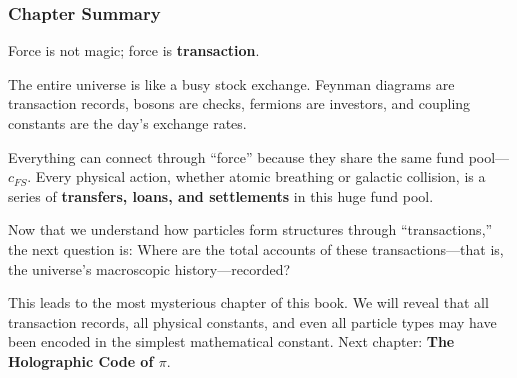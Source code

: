 \subsubsection{Chapter Summary}

Force is not magic; force is \textbf{transaction}.

The entire universe is like a busy stock exchange. Feynman diagrams are transaction records, bosons are checks, fermions are investors, and coupling constants are the day's exchange rates.

Everything can connect through ``force'' because they share the same fund pool---$c_{FS}$. Every physical action, whether atomic breathing or galactic collision, is a series of \textbf{transfers, loans, and settlements} in this huge fund pool.

Now that we understand how particles form structures through ``transactions,'' the next question is: Where are the total accounts of these transactions---that is, the universe's macroscopic history---recorded?

This leads to the most mysterious chapter of this book. We will reveal that all transaction records, all physical constants, and even all particle types may have been encoded in the simplest mathematical constant. Next chapter: \textbf{The Holographic Code of $\pi$}.

